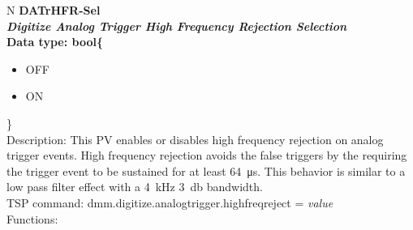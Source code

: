 \documentclass[openany]{article}
\begin{document}
		\begin{tabular}{N}
			\hline
			\bfseries DATrHFR-Sel\label{pv:datrhfr-sel} \\ \hline
			\emph{Digitize Analog Trigger High Frequency Rejection Selection} \\
			Data type: bool\{\begin{itemize}[noitemsep]
				\small
				\item[] OFF
				\item[] ON
			\end{itemize}\} \\
			Description: This PV enables or disables high frequency rejection on analog trigger events. High frequency rejection avoids the false triggers by the requiring the trigger event to be sustained for at least \SI{64}{\micro\second}. This behavior is similar to a low pass filter effect with a \SI{4}{\kilo\hertz} \SI{3}{\decibel} bandwidth. \\
			TSP command: dmm.digitize.analogtrigger.highfreqreject = \emph{value} \\
			Functions: \\
			\arrayrulecolor{\FuncTableBorderColor}

		\end{tabular}
\end{document}
